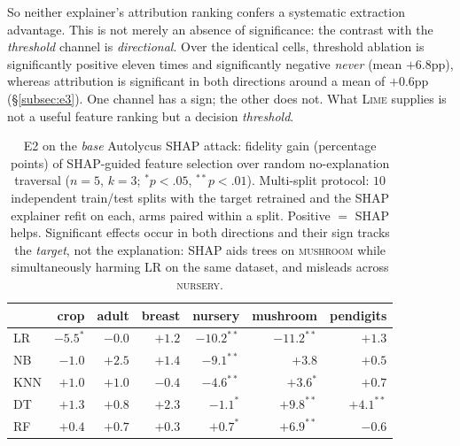 \documentclass[sigconf,anonymous,review]{acmart}
\begin{document}
So neither explainer's attribution ranking confers a systematic extraction advantage. This is not
merely an absence of significance: the contrast with the \emph{threshold} channel is \emph{directional}.
Over the identical cells, threshold ablation is significantly positive eleven times and significantly
negative \emph{never} (mean $+6.8$pp), whereas attribution is significant in both directions around a
mean of $+0.6$pp (\S\ref{subsec:e3}). One channel has a sign; the other does not.
What \textsc{Lime} supplies is not a useful feature ranking but a decision \emph{threshold}.

\begin{table}[t]
\centering
\caption{E2 on the \emph{base} Autolycus SHAP attack: fidelity gain (percentage points) of
SHAP-guided feature selection over random no-explanation traversal ($n{=}5$, $k{=}3$;
$^{*}p{<}.05$, $^{**}p{<}.01$). Multi-split protocol: $10$ independent train/test splits with the
target retrained and the SHAP explainer refit on each, arms paired within a split. Positive $=$
SHAP helps. Significant effects occur in both directions and their sign tracks the \emph{target},
not the explanation: SHAP aids trees on \textsc{mushroom} while simultaneously harming LR on the
same dataset, and misleads across \textsc{nursery}.}
\label{tab:shap-attr}
\begin{tabular}{lrrrrrr}
\toprule
 & crop & adult & breast & nursery & mushroom & pendigits \\
\midrule
LR   & $-5.5^{*}$ & $-0.0$ & $+1.2$ & $-10.2^{**}$ & $-11.2^{**}$ & $+1.3$ \\
NB   & $-1.0$ & $+2.5$ & $+1.4$ & $-9.1^{**}$ & $+3.8$ & $+0.5$ \\
KNN  & $+1.0$ & $+1.0$ & $-0.4$ & $-4.6^{**}$ & $+3.6^{*}$ & $+0.7$ \\
DT   & $+1.3$ & $+0.8$ & $+2.3$ & $-1.1^{*}$ & $+9.8^{**}$ & $+4.1^{**}$ \\
RF   & $+0.4$ & $+0.7$ & $+0.3$ & $+0.7^{*}$ & $+6.9^{**}$ & $-0.6$ \\
\bottomrule
\end{tabular}
\end{table}
\end{document}
